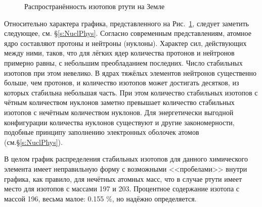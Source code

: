\documentclass[a5paper,openany]{book}
\begin{document}
\begin{figure}[ht] 
	\centering\small
	\caption{Распространённость изотопов ртути на Земле}
	\label{f:HistHg}
\end{figure} 

Относительно характера графика, представленного на Рис.~\ref{f:HistHg}, следует заметить следующее, см. \S\ref{s:NuclPhys}. Согласно современным представлениям, атомное ядро составляют протоны и нейтроны (нуклоны). Характер сил, действующих между ними, таков, что для лёгких ядер количества протонов и нейтронов примерно равны, с небольшим преобладанием последних. Число стабильных изотопов при этом невелико.  В ядрах тяжёлых элементов нейтронов существенно больше, чем протонов, и количество изотопов может достигать десятков, из которых стабильна небольшая часть. При этом количество стабильных  изотопов с чётным количеством нуклонов заметно превышает количество стабильных  изотопов с нечётным количеством нуклонов. Для энергетически выгодной конфигурации количества нуклонов существуют и другие закономерности, подобные принципу заполнению электронных оболочек атомов (см.\S\ref{s:NuclPhys}). 

В целом график распределения стабильных изотопов для данного химического элемента имеет неправильную форму с возможными <<пробелами>> внутри графика, как правило, для нечётных атомных масс, что в случае ртути имеет место для изотопов с массами 197 и 203. Процентное содержание изотопа с массой 196, весьма малое: 0.155 \%, но надёжно определяется.
\end{document}
